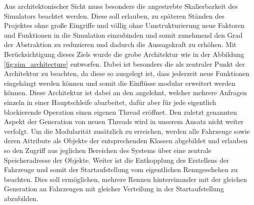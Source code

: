 Aus architektonischer Sicht muss besonders die angestrebte Skalierbarkeit des Simulators beachtet werden. Diese soll erlauben, zu späteren Ständen des Projektes ohne große Eingriffe und völlig ohne Umstrukturierung neue Faktoren und Funktionen in die Simulation einzubinden und somit zunehmend den Grad der Abstraktion zu reduzieren und dadurch die Aussagekraft zu erhöhen. Mit Berücksichtigung dieses Ziels wurde die grobe Architektur wie in der Abbildung \ref{fig:sim_architecture} entworfen. Dabei ist besonders die  als zentraler Punkt der Architektur zu beachten, da diese so ausgelegt ist, dass jederzeit neue Funktionen eingehängt werden können und somit die Einflüsse modular erweitert werden können. Diese Architektur ist dabei an den  angelehnt, welcher mehrere Anfragen einzeln in einer Hauptschleife abarbeitet, dafür aber für jede eigentlich blockierende Operation einen eigenen Thread eröffnet.\cite{pattern_oriented_architecture} Den zuletzt genannten Aspekt der Generation von neuen Threads wird in unserem Ansatz nicht weiter verfolgt. Um die Modularität zusätzlich zu erreichen, werden alle Fahrzeuge sowie deren Attribute als Objekte der entsprechenden Klassen abgebildet und erlauben so den Zugriff aus jeglichen Bereichen des Systems über eine zentrale Speicheradresse der Objekte. Weiter ist die Entkopplung des Erstellens der Fahrzeuge und somit der Startaufstellung vom eigentlichen Renngeschehen zu beachten. Dies soll ermöglichen, mehrere Rennen hintereinander mit der gleichen Generation an Fahrzeugen mit gleicher Verteilung in der Startaufstellung abzubilden.

